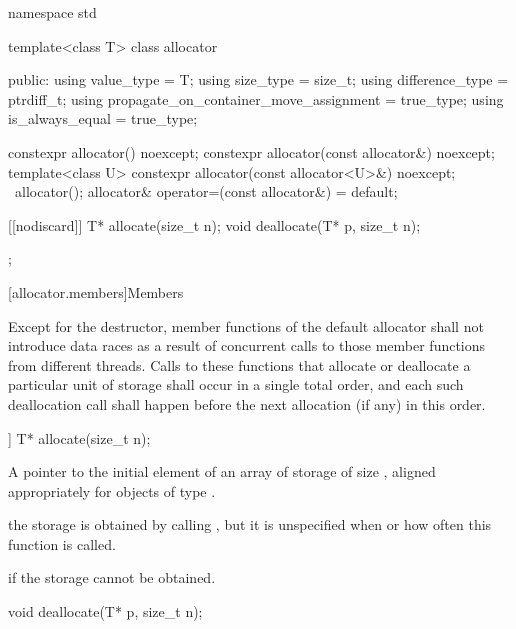 %
%
%
%
%
%
%
\begin{codeblock}
namespace std {
  template<class T> class allocator {
   public:
    using value_type      = T;
    using size_type       = size_t;
    using difference_type = ptrdiff_t;
    using propagate_on_container_move_assignment = true_type;
    using is_always_equal = true_type;

    constexpr allocator() noexcept;
    constexpr allocator(const allocator&) noexcept;
    template<class U> constexpr allocator(const allocator<U>&) noexcept;
    ~allocator();
    allocator& operator=(const allocator&) = default;

    [[nodiscard]] T* allocate(size_t n);
    void deallocate(T* p, size_t n);
  };
}
\end{codeblock}

[allocator.members]{Members}

\pnum
Except for the destructor, member functions of the default allocator shall not introduce
data races as a result of concurrent calls to those member
functions from different threads. Calls to these functions that allocate or deallocate a
particular unit of storage shall occur in a single total order, and each such
deallocation call shall happen before the next allocation (if any) in this order.

%
\begin{itemdecl}
[[nodiscard]] T* allocate(size_t n);
\end{itemdecl}

\begin{itemdescr}
\pnum
\returns
A pointer to the initial element of an array of storage of size 
, aligned appropriately for objects of type .

\pnum
\remarks
the storage is obtained by calling ,
but it is unspecified when or how often this
function is called.

\pnum
\throws
{} if the storage cannot be obtained.
\end{itemdescr}

%
\begin{itemdecl}
void deallocate(T* p, size_t n);
\end{itemdecl}


